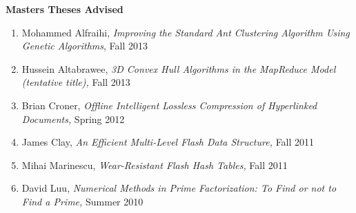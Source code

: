 \documentclass[11pt]{letter}
\begin{document}
\clearpage
{}

\textbf{Masters Theses Advised}
\begin{enumerate}
\item Mohammed Alfraihi, \emph{Improving the Standard Ant Clustering Algorithm Using Genetic Algorithms}, Fall 2013
\item Hussein Altabrawee, \emph{3D Convex Hull Algorithms in the MapReduce Model (tentative title),} Fall 2013
\item Brian Croner, \emph{Offline Intelligent Lossless Compression of Hyperlinked Documents,} Spring 2012
\item James Clay, \emph{An Efficient Multi-Level Flash Data Structure,} Fall 2011
\item Mihai Marinescu, \emph{Wear-Resistant Flash Hash Tables,} Fall 2011
\item David Luu, \emph{Numerical Methods in Prime Factorization: To Find or not to Find a Prime,} Summer 2010
\end{enumerate}
\end{document}
